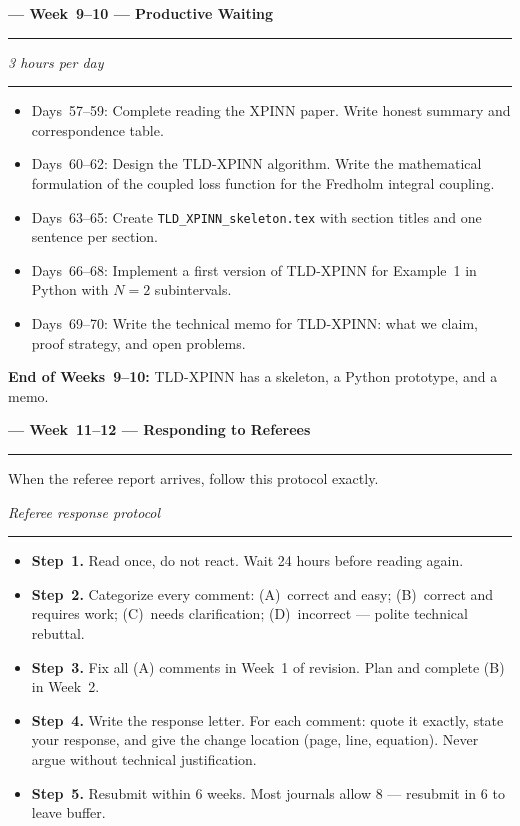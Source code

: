 \documentclass[12pt,a4paper]{article}
\newcommand{\weekheading}[2]{%
  \vspace{0.8em}
  \noindent
  {\large\bfseries\color{midblue}--- Week~#1 ---
  \hfill\normalsize\normalfont\color{darkgray}#2}
  \vspace{0.2em}
  \\{\color{midblue}\rule{\linewidth}{0.6pt}}
  \vspace{0.3em}
}
\newcommand{\dayheading}[2]{%
  \vspace{0.3em}
  \noindent{\bfseries\color{darkblue}Day~#1}%
  \hfill{\small\color{darkgray}\textit{#2}}%
  \\[-0.4em]{\color{midgray}\rule{\linewidth}{0.4pt}}%
  \vspace{0.1em}
}
\begin{document}
\weekheading{9--10}{Productive Waiting}

\begin{tcolorbox}[daystyle]
\dayheading{57--70}{3 hours per day}
\begin{itemize}[leftmargin=1.8em,itemsep=3pt]
  \item[\color{midblue}$\bullet$]
    Days~57--59: Complete reading the XPINN paper.
    Write honest summary and correspondence table.
  \item[\color{midblue}$\bullet$]
    Days~60--62: Design the TLD-XPINN algorithm. Write
    the mathematical formulation of the coupled loss
    function for the Fredholm integral coupling.
  \item[\color{midblue}$\bullet$]
    Days~63--65: Create \texttt{TLD\_XPINN\_skeleton.tex}
    with section titles and one sentence per section.
  \item[\color{midblue}$\bullet$]
    Days~66--68: Implement a first version of TLD-XPINN
    for Example~1 in Python with $N = 2$ subintervals.
  \item[\color{midblue}$\bullet$]
    Days~69--70: Write the technical memo for TLD-XPINN:
    what we claim, proof strategy, and open problems.
\end{itemize}
\noindent\textbf{End of Weeks~9--10:}
TLD-XPINN has a skeleton, a Python prototype, and a memo.
\end{tcolorbox}

\weekheading{11--12}{Responding to Referees}

\noindent When the referee report arrives, follow this
protocol exactly.

\vspace{0.5em}

\begin{tcolorbox}[daystyle]
\dayheading{Upon receipt}{Referee response protocol}
\begin{itemize}[leftmargin=1.8em,itemsep=3pt]
  \item[\color{midblue}$\bullet$]
    \textbf{Step~1.} Read once, do not react.
    Wait 24 hours before reading again.
  \item[\color{midblue}$\bullet$]
    \textbf{Step~2.} Categorize every comment:
    (A)~correct and easy;
    (B)~correct and requires work;
    (C)~needs clarification;
    (D)~incorrect --- polite technical rebuttal.
  \item[\color{midblue}$\bullet$]
    \textbf{Step~3.} Fix all (A) comments in Week~1 of
    revision. Plan and complete (B) in Week~2.
  \item[\color{midblue}$\bullet$]
    \textbf{Step~4.} Write the response letter. For each
    comment: quote it exactly, state your response, and
    give the change location (page, line, equation).
    Never argue without technical justification.
  \item[\color{midblue}$\bullet$]
    \textbf{Step~5.} Resubmit within 6 weeks.
    Most journals allow 8 --- resubmit in 6 to leave
    buffer.
\end{itemize}
\end{tcolorbox}
\end{document}
